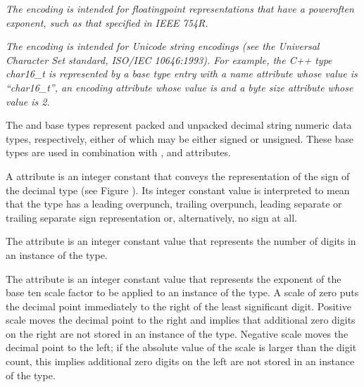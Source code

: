 \textit{The  encoding is intended for
floating\dash point representations that have a power\dash of\dash ten
exponent, such as that specified in IEEE 754R.}

\textit{The  encoding is intended for Unicode string
encodings (see the Universal Character Set standard,
ISO/IEC 10646:1993). For example, the C++ type char16\_t is
represented by a base type entry with a name attribute whose
value is “char16\_t”, an encoding attribute whose value
is  and a byte size attribute whose value is 2.}

The  and  base types
represent packed and unpacked decimal string numeric data
types, respectively, either of which may be either signed
or unsigned. These base types are used in combination with
,  and 
attributes.

A  attribute is an integer constant that
conveys the representation of the sign of the decimal type
(see Figure ). 
Its integer constant value is interpreted to
mean that the type has a leading overpunch, trailing overpunch,
leading separate or trailing separate sign representation or,
alternatively, no sign at all.

The  attribute is an integer constant
value that represents the number of digits in an instance of
the type.

The  attribute is an integer constant value
that represents the exponent of the base ten scale factor to
be applied to an instance of the type. A scale of zero puts the
decimal point immediately to the right of the least significant
digit. Positive scale moves the decimal point to the right
and implies that additional zero digits on the right are not
stored in an instance of the type. Negative scale moves the
decimal point to the left; if the absolute value of the scale
is larger than the digit count, this implies additional zero
digits on the left are not stored in an instance of the type.

